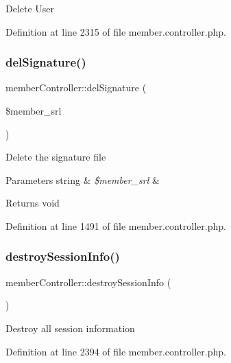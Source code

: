 Delete User 

Definition at line 2315 of file member.\+controller.\+php.

\hypertarget{classmemberController_a0fa2ec662eb7a40333ca2049a103385e}{}\label{classmemberController_a0fa2ec662eb7a40333ca2049a103385e} 
\subsubsection{\texorpdfstring{del\+Signature()}{delSignature()}}
{\footnotesize\ttfamily member\+Controller\+::del\+Signature (\begin{DoxyParamCaption}\item[{}]{\$member\+\_\+srl }\end{DoxyParamCaption})}

Delete the signature file


\begin{DoxyParams}[1]{Parameters}
string & {\em \$member\+\_\+srl} & \\
\hline
\end{DoxyParams}
\begin{DoxyReturn}{Returns}
void 
\end{DoxyReturn}


Definition at line 1491 of file member.\+controller.\+php.

\hypertarget{classmemberController_ac259eb5e2f5ea0b7e747608fa1a308bd}{}\label{classmemberController_ac259eb5e2f5ea0b7e747608fa1a308bd} 
\subsubsection{\texorpdfstring{destroy\+Session\+Info()}{destroySessionInfo()}}
{\footnotesize\ttfamily member\+Controller\+::destroy\+Session\+Info (\begin{DoxyParamCaption}{ }\end{DoxyParamCaption})}

Destroy all session information 

Definition at line 2394 of file member.\+controller.\+php.

\hypertarget{classmemberController_aeb2590d01346c9a25c2b22f99429f6a3}{}\label{classmemberController_aeb2590d01346c9a25c2b22f99429f6a3} 
